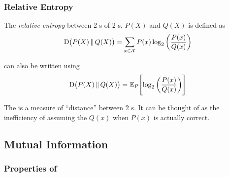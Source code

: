 \subsubsection{Relative Entropy}\label{subsubsec:Relative_Entropy}
\begin{definition}\label{def:Relative_Entropy}
  The \emph{relative entropy} between 2 s of 2 s, $P(X)$ and $Q(X)$ is defined as
  \begin{equation}\label{eq:Relative_Entropy}
    \operatorname{\operatorname{D}} \bigl( P(X) \operatorname{\Vert} Q(X) \bigr) = \sum\limits_{x \in \mathcal{X}} P(x) \log_{2} \left( \frac{P(x)}{Q(x)} \right)
  \end{equation}

   can also be written using .
  \begin{equation}\label{eq:Relative_Entropy-Expected_Value}
    \operatorname{\operatorname{D}} \bigl( P(X) \operatorname{\Vert} Q(X) \bigr) =  \operatorname{\operatorname{\mathbb{E}}}_{P} \Biggl[ \log_{2} \left( \frac{P(x)}{Q(x)} \right) \Biggr]
  \end{equation}

  \begin{remark}[Distance]\label{rmk:Relative_Entropy_Distance}
    The  is a measure of ``distance'' between 2 s.
    It can be thought of as the inefficiency of assuming the  $Q(x)$ when $P(x)$ is actually correct.
  \end{remark}
\end{definition}


\subsection{Mutual Information}\label{subsec:Mutual_Information}
\subsubsection{Properties of }\label{subsubsec:Mutual_Information_Properties}
